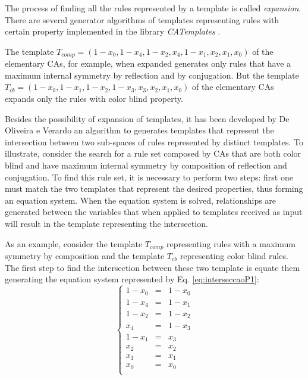 \documentclass{llncs}
\begin{document}
The process of finding all the rules represented by a template is called \textit{expansion}. There are several generator algorithms of templates representing rules with certain property implemented in the library \textit{CATemplates} \cite{CATemplates}.

The template $T_{comp} = (1 - x_0, 1 - x_4, 1 - x_2, x_4, 1 - x_1, x_2, x_1, x_0)$ of the elementary CAs, for example, when expanded generates only rules that have a maximum internal symmetry by reflection and by conjugation. %
 But the template $T_{cb} = (1 - x_0, 1 - x_1, 1 - x_2, 1 - x_3, x_3, x_2, x_1, x_0)$ of the elementary CAs expands only the rules with color blind property.

Besides the possibility of expansion of templates, it has been developed by De Oliveira e Verardo \cite{deOliveira2014b} an algorithm to generates templates that represent the intersection between two sub-spaces of rules represented by distinct templates. To illustrate, consider the search for a rule set composed by CAs that are both color blind and have maximum internal symmetry by composition of reflection and conjugation. %
 To find this rule set, it is necessary to perform two steps: first one must match the two templates that represent the desired properties, thus forming an equation system. When the equation system is solved, relationships are generated between the variables that when applied to templates received as input will result in the template representing the intersection.

As an example, consider the template $T_{comp}$ representing rules with a maximum symmetry by composition and the template $T_{cb}$ representing color blind rules. The first step to find the intersection between these two template is equate them generating the equation system represented by Eq. \ref{eq:interseccaoP1}:
\begin{equation}
\left\{\begin{matrix}
1 - x_0 & = & 1 - x_0 \\
1 - x_4 & = & 1 - x_1 \\
1 - x_2 & = & 1 - x_2 \\
x_4   & = & 1 - x_3 \\
1 - x_1 & = & x_3   \\
x_2   & = & x_2   \\
x_1   & = & x_1   \\
x_0   & = & x_0   \\
\end{matrix}\right.
\label{eq:interseccaoP1}
\end{equation}
\end{document}
